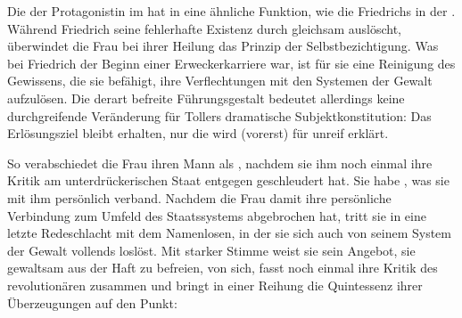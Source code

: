 
Die  der Protagonistin im \Cite{Menschenschauhaus} hat in  eine ähnliche Funktion, wie die \Cite{Wandlung} Friedrichs in der
\Cite{großen Fabrik}. Während Friedrich seine fehlerhafte Existenz durch
 gleichsam auslöscht, überwindet die Frau bei ihrer
Heilung das Prinzip der Selbstbezichtigung. Was bei Friedrich der Beginn
einer Erweckerkarriere war, ist für sie eine Reinigung des Gewissens,
die sie befähigt, ihre \Cite{schuldhaften} Verflechtungen mit den Systemen der
Gewalt aufzulösen. Die derart befreite Führungsgestalt bedeutet allerdings
keine durchgreifende Veränderung für Tollers dramatische Subjektkonstitution:
Das Erlösungsziel bleibt erhalten, nur die  wird (vorerst)
für unreif erklärt.
  
So verabschiedet die Frau ihren Mann als \Cite{Bruder}, nachdem sie ihm noch
einmal ihre Kritik am unterdrückerischen Staat entgegen geschleudert
hat. Sie habe \Cite{überwunden} , was sie mit ihm persönlich
verband.
Nachdem die Frau damit ihre persönliche Verbindung zum Umfeld des Staatssystems
abgebrochen hat, tritt sie in eine letzte Redeschlacht mit dem Namenlosen, in
der sie sich auch von seinem System der Gewalt vollends loslöst. Mit starker
Stimme weist sie sein Angebot, sie gewaltsam aus der Haft zu befreien, von
sich, fasst noch einmal ihre Kritik des revolutionären \Cite{Krieges}
zusammen und bringt in einer Reihung die Quintessenz ihrer
Überzeugungen auf den Punkt:

